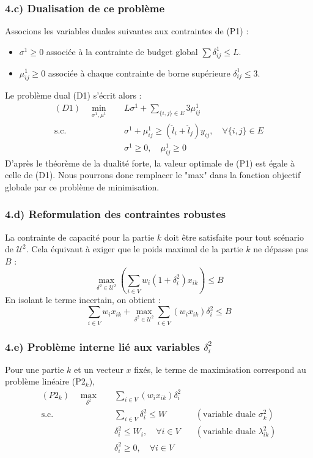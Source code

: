 \documentclass{article}
\begin{document}
\subsubsection*{4.c) Dualisation de ce problème}
Associons les variables duales suivantes aux contraintes de (P1) :
\begin{itemize}
    \item $\sigma^1 \ge 0$ associée à la contrainte de budget global $\sum \delta_{ij}^1 \le L$.
    \item $\mu_{ij}^1 \ge 0$ associée à chaque contrainte de borne supérieure $\delta_{ij}^1 \le 3$.
\end{itemize}

Le problème dual (D1) s'écrit alors :
\begin{align*}
    (D1) \quad \min_{\sigma^1, \mu^1} \quad & L \sigma^1 + \sum_{\{i,j\} \in E} 3 \mu_{ij}^1 \\
    \text{s.c.} \quad & \sigma^1 + \mu_{ij}^1 \ge (\hat{l}_i + \hat{l}_j) y_{ij}, \quad \forall \{i,j\} \in E \\
    & \sigma^1 \ge 0, \quad \mu_{ij}^1 \ge 0
\end{align*}
D'après le théorème de la dualité forte, la valeur optimale de (P1) est égale à celle de (D1). Nous pourrons donc remplacer le "max" dans la fonction objectif globale par ce problème de minimisation.
\subsubsection*{4.d) Reformulation des contraintes robustes}

La contrainte de capacité pour la partie $k$ doit être satisfaite pour tout scénario de $\mathcal{U}^2$. Cela équivaut à exiger que le poids maximal de la partie $k$ ne dépasse pas $B$ :
\[
\max_{\delta^2 \in \mathcal{U}^2} \left( \sum_{i \in V} w_i (1 + \delta_{i}^2) x_{ik} \right) \le B
\]
En isolant le terme incertain, on obtient :
\[
\sum_{i \in V} w_i x_{ik} + \max_{\delta^2 \in \mathcal{U}^2} \sum_{i \in V} (w_i x_{ik}) \delta_{i}^2 \le B
\]

\subsubsection*{4.e) Problème interne lié aux variables $\delta_{i}^2$}

Pour une partie $k$ et un vecteur $x$ fixés, le terme de maximisation correspond au problème linéaire (P2$_k$),
\begin{align*}
    (P2_k) \quad \max_{\delta^2} \quad & \sum_{i \in V} (w_i x_{ik}) \delta_{i}^2 \\
    \text{s.c.} \quad & \sum_{i \in V} \delta_{i}^2 \le W \quad & (\text{variable duale } \sigma_k^2)\\
    & \delta_{i}^2 \le W_i, \quad \forall i \in V \quad & (\text{variable duale } \lambda_{ik}^2) \\
    & \delta_{i}^2 \ge 0, \quad \forall i \in V
\end{align*}
\end{document}
